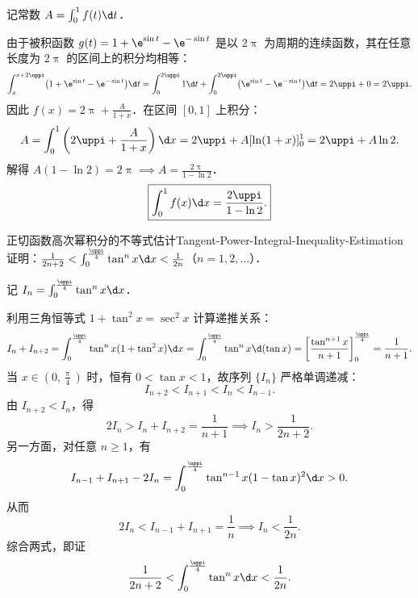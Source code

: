 \begin{solution}

    记常数 $A = \int_0^1 f(t)\d t$．

    由于被积函数 $g(t) = 1 + \e^{\sin t} - \e^{-\sin t}$ 是以 $2\uppi$ 为周期的连续函数，其在任意长度为 $2\uppi$ 的区间上的积分均相等：
    \begin{equation}
        \int_x^{x+2\uppi} \bigl(1 + \e^{\sin t} - \e^{-\sin t}\bigr)\d t = \int_0^{2\uppi} 1 \d t + \int_0^{2\uppi} \bigl(\e^{\sin t} - \e^{-\sin t}\bigr)\d t = 2\uppi + 0 = 2\uppi.
    \end{equation}
    因此 $f(x) = 2\uppi + \frac{A}{1 + x}$．在区间 $[0, 1]$ 上积分：
    \begin{equation}
        A = \int_0^1 \left( 2\uppi + \frac{A}{1 + x} \right) \d x = 2\uppi + A [\ln(1 + x)]_0^1 = 2\uppi + A\ln 2.
    \end{equation}
    解得 $A(1 - \ln 2) = 2\uppi \implies A = \frac{2\uppi}{1 - \ln 2}$．
    \begin{equation}
        \boxed{\int_0^1 f(x) \d x = \frac{2\uppi}{1 - \ln 2}.}
    \end{equation}
\end{solution}

\begin{problem}{正切函数高次幂积分的不等式估计}{Tangent-Power-Integral-Inequality-Estimation}
    证明：$\frac{1}{2n+2} < \int_0^{\frac{\uppi}{4}} \tan^n x \d x < \frac{1}{2n}$（$n = 1, 2, \dots$）．
\end{problem}

\begin{myproof}
    记 $I_n = \int_0^{\frac{\uppi}{4}} \tan^n x \d x$．

    利用三角恒等式 $1 + \tan^2 x = \sec^2 x$ 计算递推关系：
    \begin{equation}
        I_n + I_{n+2} = \int_0^{\frac{\uppi}{4}} \tan^n x (1 + \tan^2 x)\d x = \int_0^{\frac{\uppi}{4}} \tan^n x \d(\tan x) = \left[ \frac{\tan^{n+1} x}{n+1} \right]_0^{\frac{\uppi}{4}} = \frac{1}{n+1}.
    \end{equation}
    当 $x \in \left(0, \frac{\uppi}{4}\right)$ 时，恒有 $0 < \tan x < 1$，故序列 $\{I_n\}$ 严格单调递减：
    \begin{equation}
        I_{n+2} < I_{n+1} < I_n < I_{n-1}.
    \end{equation}
    由 $I_{n+2} < I_n$，得
    \begin{equation}
        2I_n > I_n + I_{n+2} = \frac{1}{n+1} \implies I_n > \frac{1}{2n+2}.
    \end{equation}
    另一方面，对任意 $n \geqslant 1$，有
    \begin{equation}
        I_{n-1} + I_{n+1} - 2I_n = \int_0^{\frac{\uppi}{4}} \tan^{n-1} x (1 - \tan x)^2 \d x > 0.
    \end{equation}
    从而
    \begin{equation}
        2I_n < I_{n-1} + I_{n+1} = \frac{1}{n} \implies I_n < \frac{1}{2n}.
    \end{equation}
    综合两式，即证
    \begin{equation}
        \frac{1}{2n+2} < \int_0^{\frac{\uppi}{4}} \tan^n x \d x < \frac{1}{2n}.
    \end{equation}
\end{myproof}

